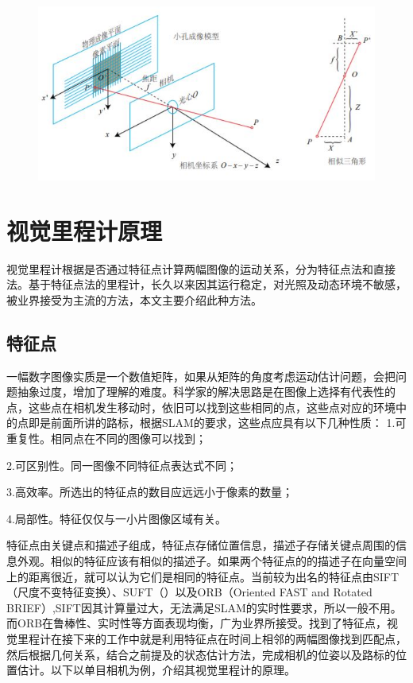 \documentclass[10.5pt,twocolumn]{jbuaa}
\begin{document}
\begin{figure}[h!]
	\centering
	\includegraphics [scale=0.35,trim=0 0 0 0]{./image/model}
\end{figure}

 
\section{视觉里程计原理}
视觉里程计根据是否通过特征点计算两幅图像的运动关系，分为特征点法和直接法。基于特征点法的里程计，长久以来因其运行稳定，对光照及动态环境不敏感，被业界接受为主流的方法，本文主要介绍此种方法。
\subsection{特征点}
一幅数字图像实质是一个数值矩阵，如果从矩阵的角度考虑运动估计问题，会把问题抽象过度，增加了理解的难度。科学家的解决思路是在图像上选择有代表性的点，这些点在相机发生移动时，依旧可以找到这些相同的点，这些点对应的环境中的点即是前面所讲的路标，根据SLAM的要求，这些点应具有以下几种性质：
1.可重复性。相同点在不同的图像可以找到；

2.可区别性。同一图像不同特征点表达式不同；

3.高效率。所选出的特征点的数目应远远小于像素的数量；

4.局部性。特征仅仅与一小片图像区域有关。

特征点由关键点和描述子组成，特征点存储位置信息，描述子存储关键点周围的信息外观。相似的特征应该有相似的描述子。如果两个特征点的的描述子在向量空间上的距离很近，就可以认为它们是相同的特征点。当前较为出名的特征点由SIFT（尺度不变特征变换）、SUFT（）以及ORB（Oriented FAST and Rotated BRIEF）,SIFT因其计算量过大，无法满足SLAM的实时性要求，所以一般不用。而ORB在鲁棒性、实时性等方面表现均衡，广为业界所接受。找到了特征点，视觉里程计在接下来的工作中就是利用特征点在时间上相邻的两幅图像找到匹配点，然后根据几何关系，结合之前提及的状态估计方法，完成相机的位姿以及路标的位置估计。以下以单目相机为例，介绍其视觉里程计的原理。
\end{document}
